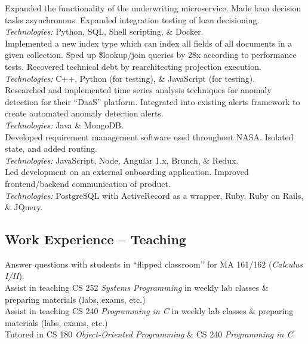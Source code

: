\documentclass[11pt,letter,sans]{moderncv}
\begin{document}
Expanded the functionality of the underwriting microservice.
Made loan decision tasks asynchronous.
Expanded integration testing of loan decisioning.
\\
\textit{Technologies:} Python, SQL, Shell scripting, \& Docker.
\\
Implemented a new index type which can index all fields of all documents in a given collection.
Sped up \$lookup/join queries by 28x according to performance tests.
Recovered technical debt by rearchitecting projection execution.
\\
\textit{Technologies:} C++, Python (for testing), \& JavaScript (for testing).
\\
Researched and implemented time series analysis techniques for anomaly detection for their ``DaaS'' platform. Integrated into existing alerts framework to create automated anomaly detection alerts.
\\
\textit{Technologies:} Java \& MongoDB.
\\
Developed requirement management software used throughout NASA.
Isolated state, and added routing.
\\
\textit{Technologies:} JavaScript, Node, Angular 1.x, Brunch, \& Redux.
\\
Led development on an external onboarding application.
Improved frontend/backend communication of product.
\\
\textit{Technologies:} PostgreSQL with ActiveRecord as a wrapper, Ruby, Ruby on Rails, \& JQuery.
\subsection{\textbf{Work Experience -- Teaching}}
Answer questions with students in ``flipped classroom'' for MA 161/162 (\textit{Calculus I/II}).
\\
Assist in teaching CS 252 \textit{Systems Programming} in weekly lab classes \& preparing materials (labs, exams, etc.)
\\
Assist in teaching CS 240 \textit{Programming in C} in weekly lab classes \& preparing materials (labs, exams, etc.)
\\
Tutored in CS 180 \textit{Object-Oriented Programming} \& CS 240 \textit{Programming in C}.
\end{document}
